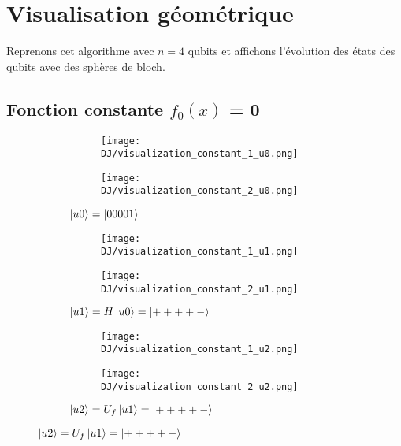\pagebreak

\section{Visualisation géométrique}
Reprenons cet algorithme avec $n=4$ qubits et affichons l'évolution des états des qubits avec des sphères de bloch.

\subsection{Fonction constante $f_0(x)$ = 0}

\begin{figure}[ht]
  \centering
  \begin{subfigure}{0.8\textwidth}
    \centering
    \begin{subfigure}[b]{0.6\textwidth}
      \centering
      \texttt{[image: DJ/visualization\_constant\_1\_u0.png]}
    \end{subfigure}
    \begin{subfigure}[b]{0.25\textwidth}
      \centering
      \texttt{[image: DJ/visualization\_constant\_2\_u0.png]}
    \end{subfigure}
    \caption{$\ket{u0}=\ket{00001}$}
  \end{subfigure}

  \begin{subfigure}{0.8\textwidth}
    \centering
    \begin{subfigure}[b]{0.6\textwidth}
      \centering
      \texttt{[image: DJ/visualization\_constant\_1\_u1.png]}
    \end{subfigure}
    \begin{subfigure}[b]{0.25\textwidth}
      \centering
      \texttt{[image: DJ/visualization\_constant\_2\_u1.png]}
    \end{subfigure}
    \caption{$\ket{u1}=H\ket{u0} = \ket{++++-}$}
  \end{subfigure}

  \begin{subfigure}{0.8\textwidth}
    \centering
    \begin{subfigure}[b]{0.6\textwidth}
      \centering
      \texttt{[image: DJ/visualization\_constant\_1\_u2.png]}
    \end{subfigure}
    \begin{subfigure}[b]{0.25\textwidth}
      \centering
      \texttt{[image: DJ/visualization\_constant\_2\_u2.png]}
    \end{subfigure}
    \caption{$\ket{u2}=U_f\ket{u1} = \ket{++++-}$}
  \end{subfigure}


\end{figure}
